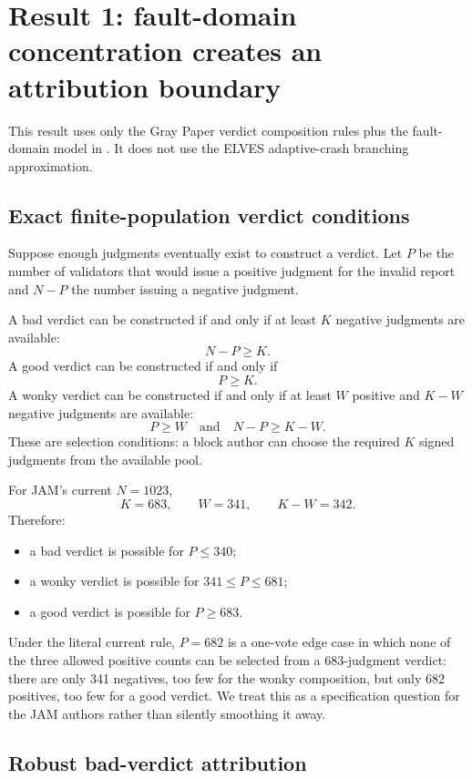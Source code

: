 \section{Result 1: fault-domain concentration creates an attribution boundary}
\label{sec:attribution}

This result uses only the Gray Paper verdict composition rules plus the fault-domain model in . It does not use the ELVES adaptive-crash branching approximation.

\subsection{Exact finite-population verdict conditions}

Suppose enough judgments eventually exist to construct a verdict. Let \(P\) be the number of validators that would issue a positive judgment for the invalid report and \(N-P\) the number issuing a negative judgment.

A bad verdict can be constructed if and only if at least \(K\) negative judgments are available:
\[
\boxed{
N-P\ge K.
}
\]
A good verdict can be constructed if and only if
\[
\boxed{
P\ge K.
}
\]
A wonky verdict can be constructed if and only if at least \(W\) positive and \(K-W\) negative judgments are available:
\[
\boxed{
P\ge W
\quad\text{and}\quad
N-P\ge K-W.
}
\]
These are selection conditions: a block author can choose the required \(K\) signed judgments from the available pool.

For JAM's current \(N=1023\),
\[
K=683,
\qquad
W=341,
\qquad
K-W=342.
\]
Therefore:
\begin{itemize}
\item a bad verdict is possible for \(P\le340\);
\item a wonky verdict is possible for \(341\le P\le681\);
\item a good verdict is possible for \(P\ge683\).
\end{itemize}

Under the literal current rule, \(P=682\) is a one-vote edge case in which none of the three allowed positive counts can be selected from a 683-judgment verdict: there are only 341 negatives, too few for the wonky composition, but only 682 positives, too few for a good verdict. We treat this as a specification question for the JAM authors rather than silently smoothing it away.

\subsection{Robust bad-verdict attribution}

